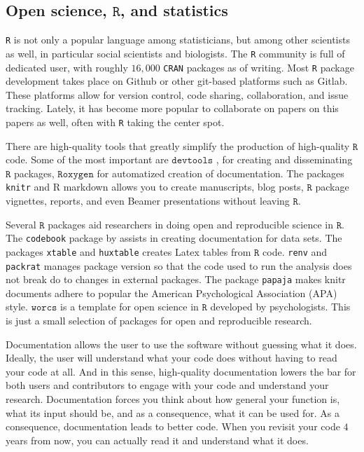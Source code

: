 \subsection{Open science, $\mathtt{R}$, and statistics}

\texttt{R} is not only a popular language among statisticians, but among other scientists as well, in particular social scientists and biologists. The \texttt{R} community is full of dedicated user, with roughly $16,000$ \texttt{CRAN} packages as of writing. Most \texttt{R} package development takes place on Github or other git-based platforms such as Gitlab. These platforms allow for version control, code sharing, collaboration, and issue tracking. Lately, it has become more popular to collaborate on papers on this papers as well, often with \texttt{R} taking the center spot.

There are high-quality tools that greatly simplify the production of high-quality $\mathtt{R}$ code. Some of the most important are $\texttt{devtools}$ , for creating and disseminating $\mathtt{R}$ packages, $\mathtt{Roxygen}$  for automatized creation of documentation. The packages \texttt{knitr}  and R markdown allows you to create manuscripts, blog posts, $\mathtt{R}$ package vignettes, reports, and even Beamer presentations without leaving $\mathtt{R}$.

Several $\mathtt{R}$ packages aid researchers in doing open and reproducible science in $\mathtt{R}$. The \texttt{codebook} package by \textcite{Arslan2019-tg} assists in creating documentation for data sets. The packages \texttt{xtable}  and \texttt{huxtable}  creates Latex tables from $\mathtt{R}$ code. \texttt{renv}  and \texttt{packrat}  manages package version so that the code used to run the analysis does not break do to changes in external packages. The package \texttt{papaja}  makes knitr documents adhere to popular the American Psychological Association (APA) style. $\mathtt{worcs}$  is a template for open science in $\mathtt{R}$ developed by psychologists. This is just a small selection of packages for open and reproducible research.

Documentation allows the user to use the software without guessing what it does. Ideally, the user will understand what your code does without having to read your code at all. And in this sense, high-quality documentation lowers the bar for both users and contributors to engage with your code and understand your research. Documentation forces you think about how general your function is, what its input should be, and as a consequence, what it can be used for. As a consequence, documentation leads to better code. When you revisit your code $4$ years from now, you can actually read it and understand what it does. 

